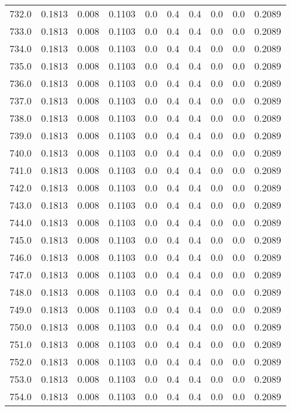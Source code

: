 \begin{longtable}{lrrrrrrrrr}
732.0 & 0.1813 & 0.008 & 0.1103 & 0.0 & 0.4 & 0.4 & 0.0 & 0.0 & 0.2089 \\
733.0 & 0.1813 & 0.008 & 0.1103 & 0.0 & 0.4 & 0.4 & 0.0 & 0.0 & 0.2089 \\
734.0 & 0.1813 & 0.008 & 0.1103 & 0.0 & 0.4 & 0.4 & 0.0 & 0.0 & 0.2089 \\
735.0 & 0.1813 & 0.008 & 0.1103 & 0.0 & 0.4 & 0.4 & 0.0 & 0.0 & 0.2089 \\
736.0 & 0.1813 & 0.008 & 0.1103 & 0.0 & 0.4 & 0.4 & 0.0 & 0.0 & 0.2089 \\
737.0 & 0.1813 & 0.008 & 0.1103 & 0.0 & 0.4 & 0.4 & 0.0 & 0.0 & 0.2089 \\
738.0 & 0.1813 & 0.008 & 0.1103 & 0.0 & 0.4 & 0.4 & 0.0 & 0.0 & 0.2089 \\
739.0 & 0.1813 & 0.008 & 0.1103 & 0.0 & 0.4 & 0.4 & 0.0 & 0.0 & 0.2089 \\
740.0 & 0.1813 & 0.008 & 0.1103 & 0.0 & 0.4 & 0.4 & 0.0 & 0.0 & 0.2089 \\
741.0 & 0.1813 & 0.008 & 0.1103 & 0.0 & 0.4 & 0.4 & 0.0 & 0.0 & 0.2089 \\
742.0 & 0.1813 & 0.008 & 0.1103 & 0.0 & 0.4 & 0.4 & 0.0 & 0.0 & 0.2089 \\
743.0 & 0.1813 & 0.008 & 0.1103 & 0.0 & 0.4 & 0.4 & 0.0 & 0.0 & 0.2089 \\
744.0 & 0.1813 & 0.008 & 0.1103 & 0.0 & 0.4 & 0.4 & 0.0 & 0.0 & 0.2089 \\
745.0 & 0.1813 & 0.008 & 0.1103 & 0.0 & 0.4 & 0.4 & 0.0 & 0.0 & 0.2089 \\
746.0 & 0.1813 & 0.008 & 0.1103 & 0.0 & 0.4 & 0.4 & 0.0 & 0.0 & 0.2089 \\
747.0 & 0.1813 & 0.008 & 0.1103 & 0.0 & 0.4 & 0.4 & 0.0 & 0.0 & 0.2089 \\
748.0 & 0.1813 & 0.008 & 0.1103 & 0.0 & 0.4 & 0.4 & 0.0 & 0.0 & 0.2089 \\
749.0 & 0.1813 & 0.008 & 0.1103 & 0.0 & 0.4 & 0.4 & 0.0 & 0.0 & 0.2089 \\
750.0 & 0.1813 & 0.008 & 0.1103 & 0.0 & 0.4 & 0.4 & 0.0 & 0.0 & 0.2089 \\
751.0 & 0.1813 & 0.008 & 0.1103 & 0.0 & 0.4 & 0.4 & 0.0 & 0.0 & 0.2089 \\
752.0 & 0.1813 & 0.008 & 0.1103 & 0.0 & 0.4 & 0.4 & 0.0 & 0.0 & 0.2089 \\
753.0 & 0.1813 & 0.008 & 0.1103 & 0.0 & 0.4 & 0.4 & 0.0 & 0.0 & 0.2089 \\
754.0 & 0.1813 & 0.008 & 0.1103 & 0.0 & 0.4 & 0.4 & 0.0 & 0.0 & 0.2089 \\

\end{longtable}
